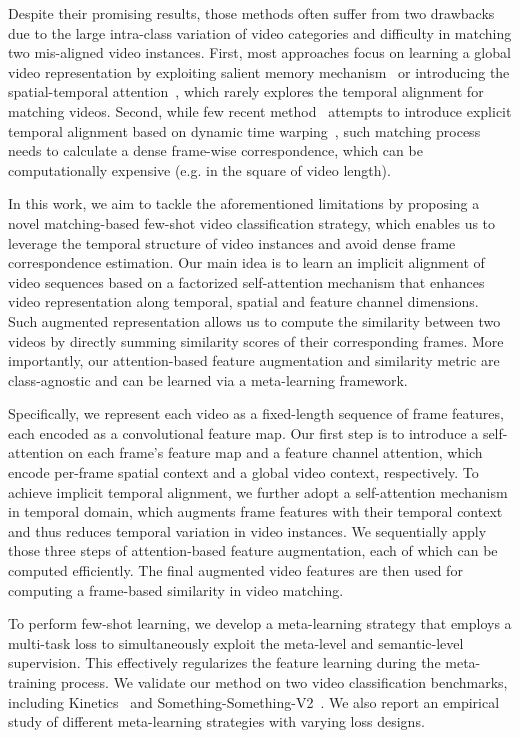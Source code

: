 \documentclass{article}
\begin{document}
Despite their promising results, those methods often suffer from two drawbacks due to the large intra-class variation of video categories and difficulty in matching two mis-aligned video instances. 
First, most approaches focus on learning a global video representation by exploiting salient memory mechanism~\cite{zhu2018compound} or introducing the spatial-temporal attention~\cite{zhang2020few}, which rarely explores the temporal alignment for matching videos. Second, while few recent method~\cite{cao2020few}  attempts to introduce explicit temporal alignment based on {dynamic time warping}~\cite{muller2007dynamic}, such matching process needs to calculate a dense frame-wise correspondence, which can be computationally expensive (e.g. in the square of video length).

In this work, we aim to tackle the aforementioned limitations by proposing a novel matching-based few-shot video classification strategy, which enables us to leverage the temporal structure of video instances and avoid dense frame correspondence estimation. Our main idea is to learn an implicit alignment of video sequences based on a factorized self-attention mechanism that enhances video representation along temporal, spatial and feature channel dimensions. Such augmented representation allows us to compute the similarity between two videos by directly summing similarity scores of their corresponding frames. More importantly, our attention-based feature augmentation and similarity metric are class-agnostic and can be learned via a meta-learning framework.   

Specifically, we represent each video as a fixed-length sequence of frame features, each encoded as a convolutional feature map. Our first step is to introduce a self-attention on each frame's feature map and a feature channel attention, which encode per-frame spatial context and a global video context, respectively. To achieve implicit temporal alignment, we further adopt a self-attention mechanism in temporal domain, which augments frame features with their temporal context and thus reduces temporal variation in video instances.    
We sequentially apply those three steps of attention-based feature augmentation, each of which can be computed efficiently. The final augmented video features are then used for computing a frame-based similarity in video matching.  
 
To perform few-shot learning, we develop a meta-learning strategy that employs a multi-task loss to simultaneously exploit the meta-level and semantic-level supervision. 
This effectively regularizes the feature learning during the meta-training process.
We validate our method on two video classification benchmarks, including Kinetics~\cite{Carreira_2017_CVPR} and Something-Something-V2~\cite{goyal2017something}. We also report an empirical study of different meta-learning strategies with varying loss designs.   
\end{document}
